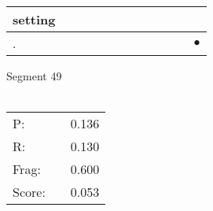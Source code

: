 \documentclass[landscape]{article}
\newcommand{\ssp}{\hspace{2pt}}
\newcommand{\mex}{\cellcolor{g}$\bullet$}
\begin{document}
\begin{tabular}{|l|p{10pt}|p{10pt}|p{10pt}|p{10pt}|p{10pt}|p{10pt}|p{10pt}|p{10pt}|p{10pt}|p{10pt}|p{10pt}|}
\hline
\ssp setting \ssp&\hspace{2pt}&\hspace{2pt}&\hspace{2pt}&\hspace{2pt}&\hspace{2pt}&\hspace{2pt}&\hspace{2pt}&\hspace{2pt}&\hspace{2pt}&\hspace{2pt}&\hspace{2pt}\\
\hline
\ssp \cellcolor{ref10}. \ssp&\hspace{2pt}&\hspace{2pt}&\hspace{2pt}&\hspace{2pt}&\hspace{2pt}&\hspace{2pt}&\hspace{2pt}&\hspace{2pt}&\hspace{2pt}&\hspace{2pt}&\hspace{2pt}\mex\\
\hline
\end{tabular}

\vspace{6pt}
\noindent Segment 49\\\\
\noindent\begin{tabular}{lm{12pt}r}
\hline
P:&&0.136\\
R:&&0.130\\
Frag:&&0.600\\
Score:&&0.053\\
\end{tabular}

\newpage
\end{document}
